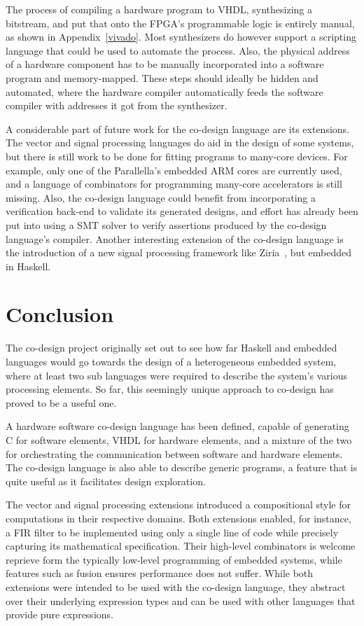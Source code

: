 \documentclass[../paper.tex]{subfiles}
\begin{document}
The process of compiling a hardware program to VHDL, synthesizing a bitstream, and put that onto the FPGA's programmable logic is entirely manual, as shown in Appendix~\ref{vivado}. Most synthesizers do however support a scripting language that could be used to automate the process. Also, the physical address of a hardware component has to be manually incorporated into a software program and memory-mapped. These steps should ideally be hidden and automated, where the hardware compiler automatically feeds the software compiler with addresses it got from the synthesizer.

A considerable part of future work for the co-design language are its extensions. The vector and signal processing languages do aid in the design of some systems, but there is still work to be done for fitting programs to many-core devices. For example, only one of the Parallella's embedded ARM cores are currently used, and a language of combinators for programming many-core accelerators is still missing. Also, the co-design language could benefit from incorporating a verification back-end to validate its generated designs, and effort has already been put into using a SMT solver to verify assertions produced by the co-design language's compiler. Another interesting extension of the co-design language is the introduction of a new signal processing framework like Ziria~\cite{ziria2015}, but embedded in Haskell.

\section{Conclusion}
\label{conc}

The co-design project originally set out to see how far Haskell and embedded languages would go towards the design of a heterogeneous embedded system, where at least two sub languages were required to describe the system's various processing elements. So far, this seemingly unique approach to co-design has proved to be a useful one.

A hardware software co-design language has been defined, capable of generating C for software elements, VHDL for hardware elements, and a mixture of the two for orchestrating the communication between software and hardware elements. The co-design language is also able to describe generic programs, a feature that is quite useful as it facilitates design exploration.

The vector and signal processing extensions introduced a compositional style for computations in their respective domains. Both extensions enabled, for instance, a FIR filter to be implemented using only a single line of code while precisely capturing its mathematical specification. Their high-level combinators is welcome reprieve form the typically low-level programming of embedded systems, while features such as fusion ensures performance does not suffer. While both extensions were intended to be used with the co-design language, they abstract over their underlying expression types and can be used with other languages that provide pure expressions.
\end{document}
